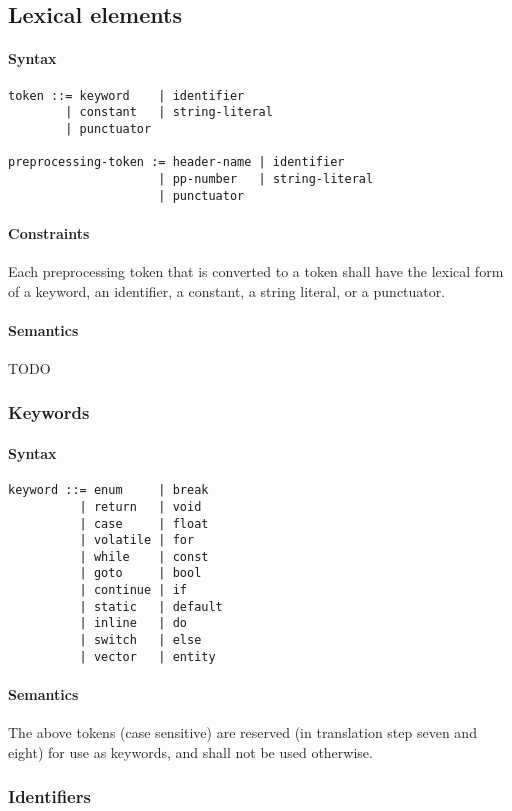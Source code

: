 \documentclass{article}
\begin{document}
\subsection{Lexical elements}
\paragraph*{Syntax}
\begin{lstlisting}[language=bnf]
token ::= keyword    | identifier
        | constant   | string-literal
        | punctuator
	
preprocessing-token := header-name | identifier
                     | pp-number   | string-literal
                     | punctuator
\end{lstlisting}
\paragraph*{Constraints}
Each preprocessing token that is converted to a token shall have the lexical form of a 
keyword, an identifier, a constant, a string literal, or a punctuator.

\paragraph*{Semantics}
TODO

\subsubsection{Keywords}
\paragraph*{Syntax}
\begin{lstlisting}[language=bnf]
keyword ::= enum     | break
          | return   | void
          | case     | float
          | volatile | for
          | while    | const
          | goto     | bool
          | continue | if
          | static   | default
          | inline   | do
          | switch   | else
          | vector   | entity
\end{lstlisting}
\paragraph*{Semantics}
The above tokens (case sensitive) are reserved (in translation step seven and eight) for 
use as keywords, and shall not be used otherwise.

\subsubsection{Identifiers}
\end{document}

